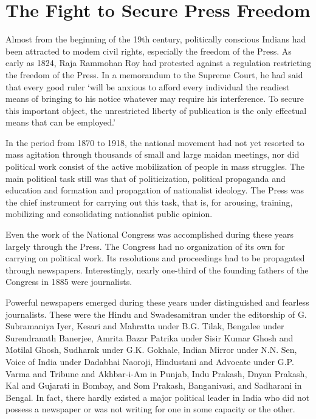 \chapter{The Fight to Secure Press Freedom}

Almost from the beginning of the 19th century, politically conscious Indians had been attracted to modem civil rights, especially the freedom of the Press. As early as 1824, Raja Rammohan Roy had protested against a regulation restricting the freedom of the Press. In a memorandum to the Supreme Court, he had said that every good ruler `will be anxious to afford every individual the readiest means of bringing to his notice whatever may require his interference. To secure this important object, the unrestricted liberty of publication is the only effectual means that can be employed.'

In the period from 1870 to 1918, the national movement had not yet resorted to mass agitation through thousands of small and large maidan meetings, nor did political work consist of the active mobilization of people in mass struggles. The main political task still was that of politicization, political propaganda and education and formation and propagation of nationalist ideology. The Press was the chief instrument for carrying out this task, that is, for arousing, training, mobilizing and consolidating nationalist public opinion.

Even the work of the National Congress was accomplished during these years largely through the Press. The Congress had no organization of its own for carrying on political work. Its resolutions and proceedings had to be propagated through newspapers. Interestingly, nearly one-third of the founding fathers of the Congress in 1885 were journalists.

Powerful newspapers emerged during these years under distinguished and fearless journalists. These were the Hindu and Swadesamitran under the editorship of G. Subramaniya Iyer, Kesari and Mahratta under B.G. Tilak, Bengalee under Surendranath Banerjee, Amrita Bazar Patrika under Sisir Kumar Ghosh and Motilal Ghosh, Sudharak under G.K. Gokhale, Indian Mirror under N.N. Sen, Voice of India under Dadabhai Naoroji, Hindustani and Advocate under G.P. Varma and Tribune and Akhbar-i-Am in Punjab, Indu Prakash, Dnyan Prakash, Kal and Gujarati in Bombay, and Som Prakash, Banganivasi, and Sadharani in Bengal. In fact, there hardly existed a major political leader in India who did not possess a newspaper or was not writing for one in some capacity or the other.

